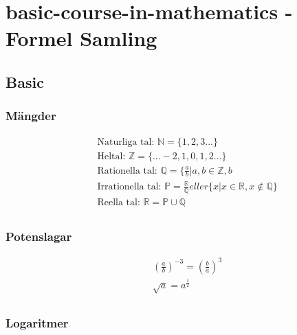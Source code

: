 \chapter{basic-course-in-mathematics - Formel Samling}

\newpage

\section{Basic}
\subsection{Mängder}
\begin{align*}
  &\quad \text{Naturliga tal: } \mathbb{N} = \{ 1, 2 , 3 ...  \} \\
  &\quad \text{Heltal: }\mathbb{Z} = \{... -2, 1, 0, 1, 2 ...  \} \\
  &\quad \text{Rationella tal: }\mathbb{Q} = \{ \frac{a}{b} | a,b \in \mathbb{Z}, b \\
  &\quad \text{Irrationella tal: }\mathbb{P} = \frac{\mathbb{R}}{\mathbb{Q}}eller \{ x | x \in \mathbb{R}, x \notin \mathbb{Q} \} \\
  &\quad \text{Reella tal: }\mathbb{R} =  \mathbb{P} \cup \mathbb{Q} \\
\end{align*}


\subsection{Potenslagar}
\begin{align*}
  &\quad (\frac{a}{b})^{-3} = (\frac{b}{a})^{3}\\
  &\quad \sqrt{a} = a^{\frac{1}{2}} \\
\end{align*}


\subsection{Logaritmer}
%


